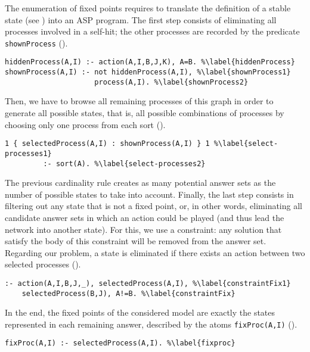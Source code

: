 The enumeration of fixed points requires to translate the definition of a stable state (see )
into an ASP program.
The first step consists of eliminating all processes involved in a self-hit;
the other processes are recorded by the predicate \texttt{shownProcess} ().
\begin{lstlisting}
hiddenProcess(A,I) :- action(A,I,B,J,K), A=B. %\label{hiddenProcess}
shownProcess(A,I) :- not hiddenProcess(A,I), %\label{shownProcess1}
                     process(A,I). %\label{shownProcess2}
\end{lstlisting}
Then, we have to browse all remaining processes of this graph in order to generate all possible states,
that is, all possible combinations of processes by choosing only one process from each sort ().
\begin{lstlisting}
1 { selectedProcess(A,I) : shownProcess(A,I) } 1 %\label{select-processes1}
         :- sort(A). %\label{select-processes2}
\end{lstlisting}
The previous cardinality rule creates as many potential answer sets as the number of possible states
to take into account.
Finally, the last step consists in filtering out any state that is not a fixed point,
or, in other words, eliminating all candidate answer sets in which an action could be played (and thus lead the network into another state).
For this, we use a constraint:
any solution that satisfy the body of this constraint will be removed from the answer set.
Regarding our problem, a state is eliminated if there exists an action between two selected processes ().
\begin{lstlisting}
:- action(A,I,B,J,_), selectedProcess(A,I), %\label{constraintFix1}
    selectedProcess(B,J), A!=B. %\label{constraintFix}
\end{lstlisting}
In the end, the fixed points of the considered model are exactly the states represented in each remaining answer,
described by the atoms \texttt{fixProc(A,I)} ().
\begin{lstlisting}
fixProc(A,I) :- selectedProcess(A,I). %\label{fixproc}
\end{lstlisting}

